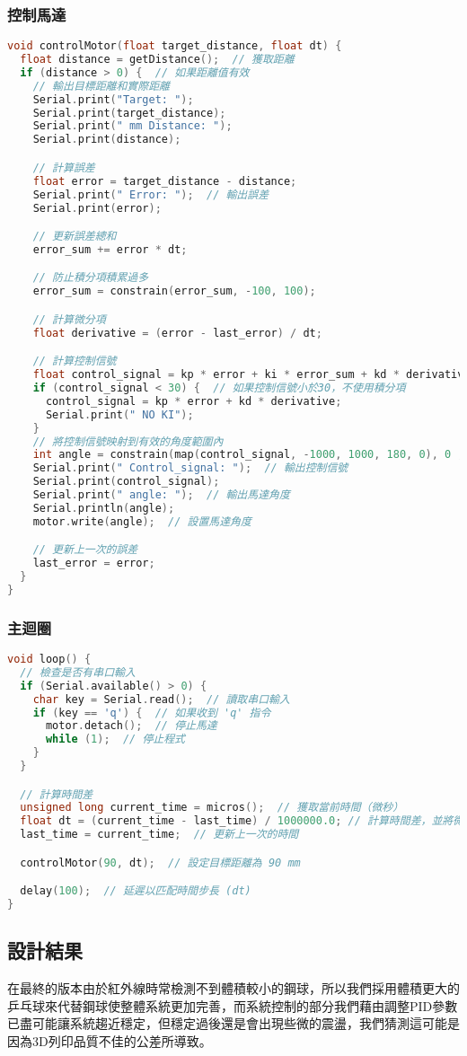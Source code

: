 \subsubsection{控制馬達}
\begin{lstlisting}[language=C]
void controlMotor(float target_distance, float dt) {
  float distance = getDistance();  // 獲取距離
  if (distance > 0) {  // 如果距離值有效
    // 輸出目標距離和實際距離
    Serial.print("Target: ");
    Serial.print(target_distance);
    Serial.print(" mm Distance: ");
    Serial.print(distance);

    // 計算誤差
    float error = target_distance - distance;
    Serial.print(" Error: ");  // 輸出誤差
    Serial.print(error);

    // 更新誤差總和
    error_sum += error * dt;

    // 防止積分項積累過多
    error_sum = constrain(error_sum, -100, 100);

    // 計算微分項
    float derivative = (error - last_error) / dt;

    // 計算控制信號
    float control_signal = kp * error + ki * error_sum + kd * derivative;
    if (control_signal < 30) {  // 如果控制信號小於30，不使用積分項
      control_signal = kp * error + kd * derivative;
      Serial.print(" NO KI");
    }
    // 將控制信號映射到有效的角度範圍內
    int angle = constrain(map(control_signal, -1000, 1000, 180, 0), 0 , 180);
    Serial.print(" Control_signal: ");  // 輸出控制信號
    Serial.print(control_signal);
    Serial.print(" angle: ");  // 輸出馬達角度
    Serial.println(angle);
    motor.write(angle);  // 設置馬達角度

    // 更新上一次的誤差
    last_error = error;
  }
}
\end{lstlisting}

\subsubsection{主迴圈}
\begin{lstlisting}[language=C]
void loop() {
  // 檢查是否有串口輸入
  if (Serial.available() > 0) {
    char key = Serial.read();  // 讀取串口輸入
    if (key == 'q') {  // 如果收到 'q' 指令
      motor.detach();  // 停止馬達
      while (1);  // 停止程式
    }
  }

  // 計算時間差
  unsigned long current_time = micros();  // 獲取當前時間（微秒）
  float dt = (current_time - last_time) / 1000000.0; // 計算時間差，並將微秒轉換為秒
  last_time = current_time;  // 更新上一次的時間

  controlMotor(90, dt);  // 設定目標距離為 90 mm

  delay(100);  // 延遲以匹配時間步長 (dt)
}
\end{lstlisting}

\subsection{設計結果}
在最終的版本由於紅外線時常檢測不到體積較小的鋼球，所以我們採用體積更大的乒乓球來代替鋼球使整體系統更加完善，而系統控制的部分我們藉由調整PID參數已盡可能讓系統趨近穩定，但穩定過後還是會出現些微的震盪，我們猜測這可能是因為3D列印品質不佳的公差所導致。



